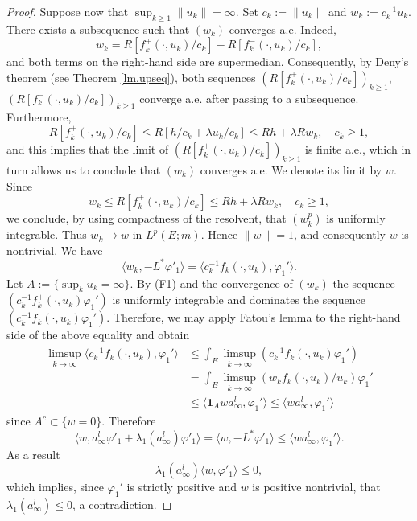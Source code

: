\documentclass[11pt,a4paper,reqno]{amsart}
\theoremstyle{definition}
\numberwithin{equation}{section}
\begin{document}
\begin{proof}
Suppose now that $\sup_{k\ge 1}\|u_k\|=\infty$.
Set $c_k:= \|u_k\|$  and $w_k:= c_k^{-1} u_k$.
There exists a subsequence such that  $(w_k)$  converges a.e. 
Indeed, 
\[
w_k=R[f^+_k(\cdot,u_k)/c_k]-R[f^-_k(\cdot,u_k)/c_k],
\]
and both terms on the right-hand side are supermedian. Consequently, by Deny's theorem (see Theorem  \ref{lm.upseq}),
both sequences $(R[f^+_k(\cdot,u_k)/c_k])_{k\ge 1}$, $(R[f^-_k(\cdot,u_k)/c_k])_{k\ge 1}$  
converge  a.e. after passing to a subsequence.
Furthermore, 
\[
R[f^+_k(\cdot,u_k)/c_k]\le  R[h/c_k+\lambda u_k/c_k]\le  Rh+\lambda Rw_k,\quad c_k\ge 1,
\]
and this  implies  that the limit of $(R[f^+_k(\cdot,u_k)/c_k])_{k\ge 1}$ is finite a.e., 
which in turn allows us to conclude that $(w_k)$ converges a.e. We denote its limit by $w$.
Since
\[
w_k\le R[f^+_k(\cdot,u_k)/c_k]\le  Rh+\lambda Rw_k,\quad c_k\ge 1,
\]
we conclude, by using compactness of the resolvent, that $(w_k^p)$ is uniformly integrable.
Thus $w_k\to w$ in $L^p(E;m)$. Hence $\|w\|=1$, and consequently $w$ is nontrivial.
We have 
\[
\langle w_k,-L^*\varphi'_1\rangle=\langle c_k^{-1}f_k(\cdot,u_k),\varphi_1'\rangle.
\]
Let  $A:= \{\sup_{k} u_k=\infty\}$. 
By  (F1) and the convergence of $(w_k)$ the sequence 
$(c_k^{-1}f^+_k(\cdot,u_k)\varphi_1')$ is uniformly integrable and dominates the sequence $(c_k^{-1}f_k(\cdot,u_k)\varphi_1')$. 
Therefore, we may apply Fatou's lemma to the right-hand side of the above equality and obtain
\[
\begin{split}
\limsup_{k\to \infty}\langle c_k^{-1}f_k(\cdot,u_k),\varphi_1'\rangle  
& \le 
\int_E \limsup_{k\to \infty}\left(c_k^{-1}f_k(\cdot,u_k)\varphi_1' \right)
\\&=\int_E \limsup_{k\to \infty} \left(w_k f_k(\cdot,u_k)/u_k\right)\varphi_1' 
\\&
\le \langle \mathbf1_Aw a^l_\infty,\varphi_1'\rangle \le \langle w a_\infty^l,\varphi_1'\rangle
\end{split}
\]
since $A^c\subset \{w=0\}$. Therefore
\[
\langle w,a_\infty^l\varphi'_1+\lambda_1(a_\infty^l)\varphi'_1\rangle
=\langle w,-L^*\varphi'_1\rangle\le \langle w a_\infty^l,\varphi_1'\rangle.
\]
As a result
\[
\lambda_1(a_\infty^l)\langle w,\varphi'_1\rangle\le 0,
\]
which implies, since $\varphi_1'$ is strictly positive and $w$ is positive nontrivial, that $\lambda_1(a_\infty^l)\le 0$, a contradiction.
\end{proof}
\end{document}
